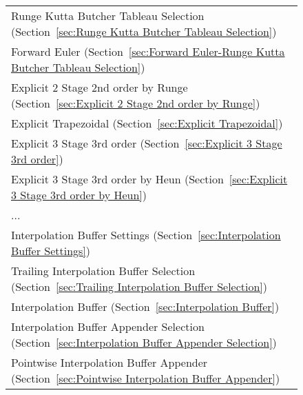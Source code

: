 \begin{figure}
\begin{tabular}{p{}}
\hspace*{0.4in} Runge Kutta Butcher Tableau Selection (Section~\ref{sec:Runge Kutta Butcher Tableau Selection})
    \index{Runge Kutta Butcher Tableau Selection} \\ 
\hspace*{0.6in} Forward Euler (Section~\ref{sec:Forward Euler-Runge Kutta Butcher Tableau Selection})
    \index{Forward Euler} \\ 
\hspace*{0.6in} Explicit 2 Stage 2nd order by Runge (Section~\ref{sec:Explicit 2 Stage 2nd order by Runge})
    \index{Explicit 2 Stage 2nd order by Runge} \\ 
\hspace*{0.6in} Explicit Trapezoidal (Section~\ref{sec:Explicit Trapezoidal})
    \index{Explicit Trapezoidal} \\ 
\hspace*{0.6in} Explicit 3 Stage 3rd order (Section~\ref{sec:Explicit 3 Stage 3rd order})
    \index{Explicit 3 Stage 3rd order} \\ 
\hspace*{0.6in} Explicit 3 Stage 3rd order by Heun (Section~\ref{sec:Explicit 3 Stage 3rd order by Heun})
    \index{Explicit 3 Stage 3rd order by Heun} \\ 
\hspace*{0.6in}  ... \\ 
\hspace*{0.2in} Interpolation Buffer Settings (Section~\ref{sec:Interpolation Buffer Settings})
    \index{Interpolation Buffer Settings} \\ 
\hspace*{0.4in} Trailing Interpolation Buffer Selection (Section~\ref{sec:Trailing Interpolation Buffer Selection})
    \index{Trailing Interpolation Buffer Selection} \\ 
\hspace*{0.6in} Interpolation Buffer (Section~\ref{sec:Interpolation Buffer})
    \index{Interpolation Buffer} \\ 
\hspace*{0.4in} Interpolation Buffer Appender Selection (Section~\ref{sec:Interpolation Buffer Appender Selection})
    \index{Interpolation Buffer Appender Selection} \\ 
\hspace*{0.6in} Pointwise Interpolation Buffer Appender (Section~\ref{sec:Pointwise Interpolation Buffer Appender})
    \index{Pointwise Interpolation Buffer Appender} \\ 

\end{tabular}
\end{figure}
